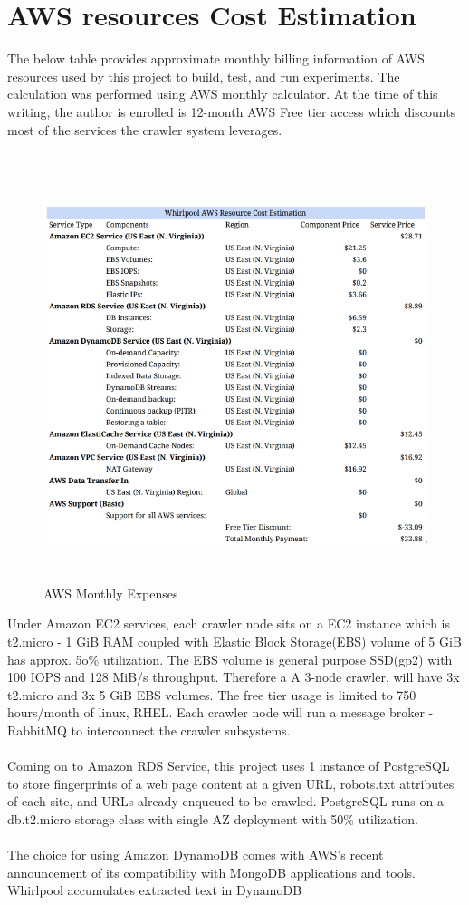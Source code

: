 \section{AWS resources Cost Estimation}
The below table provides approximate monthly billing information of AWS resources used by this project to build, test, and run experiments. The calculation was performed using AWS monthly calculator. At the time of
this writing, the author is enrolled is 12-month AWS Free tier access which discounts most of the services
the crawler system leverages.
\\
\\
\begin{figure}[h!]
  \centering
  \includegraphics[width=20cm,height=12cm,keepaspectratio]{../media/crawler/aws-cost-estimate.png}
  \caption{AWS Monthly Expenses}
  \label{fig:awscost}
\end{figure}

\noindent
Under Amazon EC2 services, each crawler node sits on a EC2 instance which is t2.micro - 1 GiB RAM coupled
with Elastic Block Storage(EBS) volume of 5 GiB has approx. 5o\% utilization. The EBS volume is general purpose SSD(gp2) with 100 IOPS and 128 MiB/s throughput. Therefore a A 3-node crawler, will have 3x t2.micro and 3x 5 GiB EBS volumes. The free tier usage is limited to 750 hours/month of linux, RHEL. Each crawler node will run a message broker - RabbitMQ to interconnect the crawler subsystems.
\\
\\
Coming on to Amazon RDS Service, this project uses 1 instance of PostgreSQL to store fingerprints of a web page content at a given URL, robots.txt attributes of each site, and URLs already enqueued to be crawled.
PostgreSQL runs on a db.t2.micro storage class with single AZ deployment with 50\% utilization.
\\
\\
The choice for using Amazon DynamoDB comes with AWS's recent announcement of its compatibility with
MongoDB applications and tools. Whirlpool accumulates extracted text in DynamoDB
\pagebreak